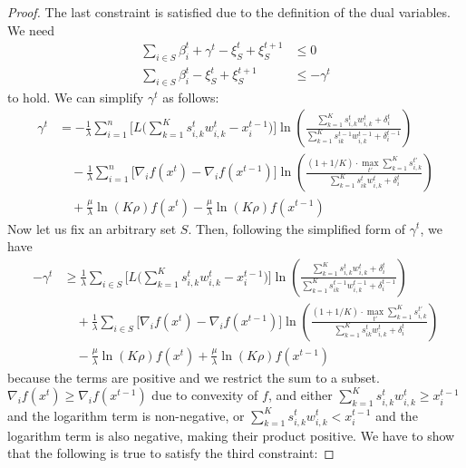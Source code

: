 \begin{proof}
The last constraint is satisfied due to the definition of the dual variables. We need
\begin{align*}
  \sum_{i \in S}\beta_{i}^{t} + \gamma^{t} - \xi_{S}^{t} + \xi_{S}^{t+1}  &\leq 0\\
  \sum_{i \in S}\beta_{i}^{t} - \xi_{S}^{t} + \xi_{S}^{t+1}  &\leq -\gamma^{t}
\end{align*}
%
to hold. We can simplify $\gamma^{t}$ as follows:
\begin{align*}
    \gamma^{t} &= -  \frac{1}{\lambda} \sum_{i=1}^{n} \biggl[ L\biggl( \sum_{k=1}^{K} s_{i,k}^{t} w_{i,k}^{t}  - x_{i}^{t-1} \biggr) \biggr]  \ln \left( \frac{\sum_{k=1}^{K} s_{i,k}^{t} w_{i,k}^{t} + \delta_{i}^{t}}{\sum_{k=1}^{K}  s_{ik}^{t-1}w_{i,k}^{t-1}  + \delta_{i}^{t-1}} \right) \\
    	& \quad - \frac{1}{\lambda} \sum_{i=1}^{n} \biggl[ \nabla_{i} f(x^{t}) - \nabla_{i} f(x^{t-1}) \biggr] \ln \left( \frac{(1 + 1/K) \cdot \max_{t'} \sum_{k=1}^{K} s_{i,k}^{t'}}{\sum_{k=1}^{K}  s_{ik}^{t}w_{i,k}^{t}  + \delta_{i}^{t}} \right)  \\
	& \quad + \frac{\mu}{\lambda} \ln(K\rho) f(x^{t}) - \frac{\mu}{\lambda} \ln(K\rho) f(x^{t-1})
\end{align*}
%
Now let us fix an arbitrary set $S$. Then, following the simplified form of $\gamma^t$, we have
\begin{align*}
    -\gamma^{t} &\geq     \frac{1}{\lambda} \sum_{i \in S} \biggl[ L\biggl( \sum_{k=1}^{K} s_{i,k}^{t} w_{i,k}^{t}  - x_{i}^{t-1} \biggr) \biggr]  \ln \left( \frac{\sum_{k=1}^{K} s_{i,k}^{t} w_{i,k}^{t} + \delta_{i}^{t}}{\sum_{k=1}^{K}  s_{ik}^{t-1}w_{i,k}^{t-1}  + \delta_{i}^{t-1}} \right) \\
            & \quad + \frac{1}{\lambda} \sum_{i \in S} \biggl[ \nabla_{i} f(x^{t}) - \nabla_{i} f(x^{t-1}) \biggr] \ln \left( \frac{(1 + 1/K) \cdot \max_{t'} \sum_{k=1}^{K} s_{i,k}^{t'}}{\sum_{k=1}^{K}  s_{ik}^{t}w_{i,k}^{t}  + \delta_{i}^{t}} \right)  \\
        & \quad - \frac{\mu}{\lambda} \ln(K\rho) f(x^{t}) + \frac{\mu}{\lambda} \ln(K\rho) f(x^{t-1})
\end{align*}
because the terms are positive and we restrict the sum to a subset. $\nabla_{i} f(x^{t}) \geq \nabla_{i} f(x^{t-1})$ due to convexity of $f$, and either $\sum_{k=1}^{K} s_{i,k}^{t} w_{i,k}^{t} \geq x_{i}^{t-1}$ and the logarithm term is non-negative, or $\sum_{k=1}^{K} s_{i,k}^{t} w_{i,k}^{t} < x_{i}^{t-1}$ and the logarithm term is also negative, making their product positive.
%
We have to show that the following is true to satisfy the third constraint:

\end{proof}
